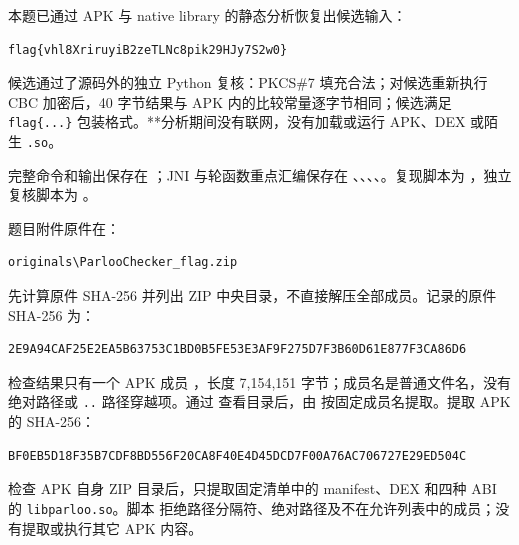 本题已通过 APK 与 native library 的静态分析恢复出候选输入：

\begin{verbatim}
flag{vhl8XriruyiB2zeTLNc8pik29HJy7S2w0}
\end{verbatim}

候选通过了源码外的独立 Python 复核：PKCS\#7 填充合法；对候选重新执行 CBC 加密后，40 字节结果与 APK 内的比较常量逐字节相同；候选满足 \texttt{flag\{...\}} 包装格式。**分析期间没有联网，没有加载或运行 APK、DEX 或陌生 \texttt{.so}。

完整命令和输出保存在 \texttt{}；JNI 与轮函数重点汇编保存在 \texttt{}、\texttt{}、\texttt{}、\texttt{}、\texttt{}。复现脚本为 \texttt{}，独立复核脚本为 \texttt{}。

题目附件原件在：

\begin{verbatim}
originals\ParlooChecker_flag.zip
\end{verbatim}

先计算原件 SHA-256 并列出 ZIP 中央目录，不直接解压全部成员。记录的原件 SHA-256 为：

\begin{verbatim}
2E9A94CAF25E2EA5B63753C1BD0B5FE53E3AF9F275D7F3B60D61E877F3CA86D6
\end{verbatim}

检查结果只有一个 APK 成员 \texttt{}，长度 7,154,151 字节；成员名是普通文件名，没有绝对路径或 \texttt{..} 路径穿越项。通过 \texttt{} 查看目录后，由 \texttt{} 按固定成员名提取。提取 APK 的 SHA-256：

\begin{verbatim}
BF0EB5D18F35B7CDF8BD556F20CA8F40E4D45DCD7F00A76AC706727E29ED504C
\end{verbatim}

检查 APK 自身 ZIP 目录后，只提取固定清单中的 manifest、DEX 和四种 ABI 的 \texttt{libparloo.so}。脚本 \texttt{} 拒绝路径分隔符、绝对路径及不在允许列表中的成员；没有提取或执行其它 APK 内容。

